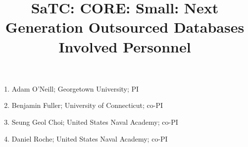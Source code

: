 \documentclass[11pt]{article}
\begin{document}
\title{SaTC: CORE: Small: Next Generation Outsourced Databases Involved Personnel}

\maketitle

\begin{enumerate}
\item Adam O'Neill; Georgetown University; PI
\item Benjamin Fuller; University of Connecticut; co-PI
\item Seung Geol Choi; United States Naval Academy; co-PI
\item Daniel Roche; United States Naval Academy; co-PI
\end{enumerate}
\end{document}
